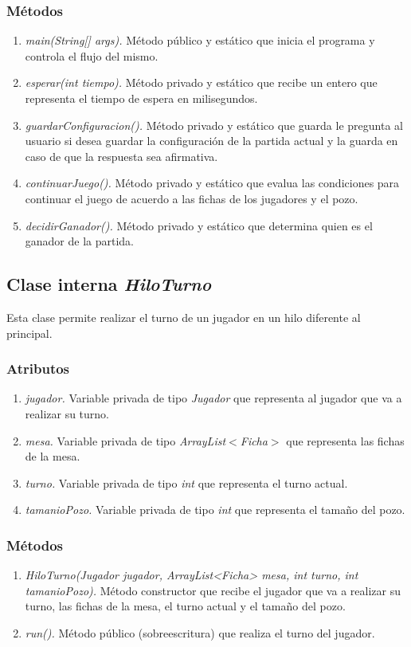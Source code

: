 \documentclass[12pt]{article}
\begin{document}
  \subsubsection{Métodos}
  \begin{enumerate}
    \item \textit{main(String[] args).} Método público y estático que inicia el programa y controla el flujo del mismo.
    \item \textit{esperar(int tiempo).} Método privado y estático que recibe un entero que representa el tiempo de espera en milisegundos.
    \item \textit{guardarConfiguracion().} Método privado y estático que guarda le pregunta al usuario si desea guardar la configuración de la partida actual y la guarda en caso de que la respuesta sea afirmativa.
    \item \textit{continuarJuego().} Método privado y estático que evalua las condiciones para continuar el juego de acuerdo a las fichas de los jugadores y el pozo.
    \item \textit{decidirGanador().} Método privado y estático que determina quien es el ganador de la partida.
  \end{enumerate}

  \subsection{Clase interna \textit{HiloTurno}}
  Esta clase permite realizar el turno de un jugador en un hilo diferente al principal.

  \subsubsection{Atributos}
  \begin{enumerate}
    \item \textit{jugador.} Variable privada de tipo \textit{Jugador} que representa al jugador que va a realizar su turno.
    \item \textit{mesa.} Variable privada de tipo \textit{ArrayList$<$Ficha$>$} que representa las fichas de la mesa.
    \item \textit{turno.} Variable privada de tipo \textit{int} que representa el turno actual.
    \item \textit{tamanioPozo.} Variable privada de tipo \textit{int} que representa el tamaño del pozo.
  \end{enumerate}

  \subsubsection{Métodos}
  \begin{enumerate}
    \item \textit{HiloTurno(Jugador jugador, ArrayList<Ficha> mesa, int turno, int tamanioPozo).} Método constructor que recibe el jugador que va a realizar su turno, las fichas de la mesa, el turno actual y el tamaño del pozo.
    \item \textit{run().} Método público (sobreescritura) que realiza el turno del jugador.
  \end{enumerate}
\end{document}
